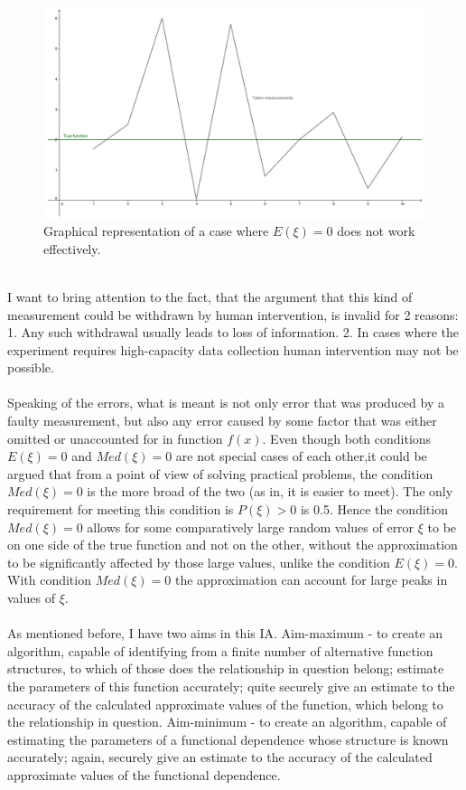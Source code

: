 \documentclass[11pt,a4paper]{article}
\numberwithin{equation}{subsection}
\begin{document}
\begin{figure}[h!]
\includegraphics[scale=0.1]{pic-naturallimits}
\centering
\caption{Graphical representation of a case where $E(\xi)=0$ does not work effectively.}
\label{fig:graph-nl}
\end{figure}
\\
I want to bring attention to the fact, that the argument that this kind of measurement could be withdrawn by human intervention, is invalid for 2 reasons: 1. Any such withdrawal usually leads to loss of information. 2. In cases where the experiment requires high-capacity data collection human intervention may not be possible.\\
\\
Speaking of the errors, what is meant is not only error that was produced by a faulty measurement, but also any error caused by some factor that was either omitted or unaccounted for in function $f(x)$. Even though both conditions $E(\xi)=0$ and $Med(\xi)=0$ are not special cases of each other,it could be argued that from a point of view of solving practical problems, the condition $Med(\xi)=0$ is the more broad of the two (as in, it is easier to meet). The only requirement for meeting this condition is $P(\xi)>0$ is 0.5.  Hence the condition $Med(\xi)=0$ allows for some comparatively large random values of error $\xi$ to be on one side of the true function and not on the other, without the approximation to be significantly affected by those large values, unlike the condition $E(\xi)=0$. With condition $Med(\xi)=0$ the approximation can account for large peaks in values of $\xi$.\\
\\
As mentioned before, I have two aims in this IA. Aim-maximum - to create an algorithm, capable of identifying from a finite number of alternative function structures, to which of those does the relationship in question belong; estimate the parameters of this function accurately; quite securely give an estimate to the accuracy of the calculated approximate values of the function, which belong to the relationship in question. Aim-minimum - to create an algorithm, capable of estimating the parameters of a functional dependence whose structure is known accurately; again, securely give an estimate to the accuracy of the calculated approximate values of the functional dependence. \\
\end{document}
